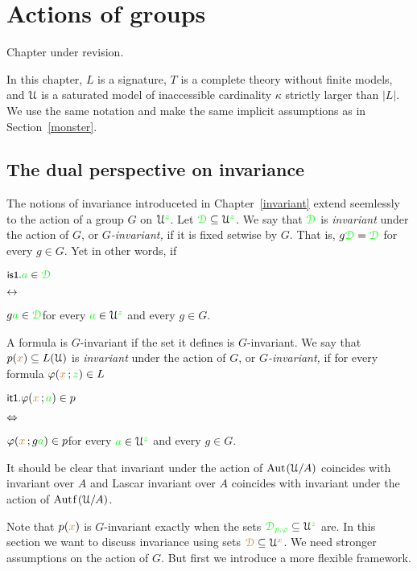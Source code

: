 \chapter{Actions of groups}
\label{actions}

\def\medrel#1{\parbox[t]{5ex}{$\displaystyle\hfil #1$}}
\def\ceq#1#2#3{\parbox[t]{17ex}{$\displaystyle #1$}\medrel{#2}{$\displaystyle #3$}}

\noindent\llap{\textcolor{red}{\Large\warning}\kern1.5ex}\ignorespaces
Chapter under revision.

In this chapter, $L$ is a signature, $T$ is a complete theory without finite models, and $\EuScript U$ is a saturated model of inaccessible cardinality $\kappa$ strictly larger than $|L|$.
We use the same notation and make the same implicit assumptions as in Section~\ref{monster}.

\section{The dual perspective on invariance}\label{dual_perspective}

The notions of invariance introduceted in Chapter~\ref{invariant} extend seemlessly to the action of a group $G$ on $\EuScript U^{\color{green} z}$.
Let ${\color{green}\EuScript D}\subseteq\EuScript U^{\color{green} z}$.
We say that ${\color{green}\EuScript D}$ is \emph{invariant\/} under the action of $G$, or \emph{$G$-invariant,} if it is fixed setwise by $G$.
That is, $g{\color{green}\EuScript D}={\color{green}\EuScript D}$ for every $g\in G$.
Yet in other words, if

\ceq{\ssf{is1.}\hfill {\gr a}\in\grD}{\iff}{g{\gr a}\in\grD}\hfill for every ${\color{green} a}\in\EuScript U^{\color{green} z}$ and every $g\in G$.

A formula is $G$-invariant if the set it defines is $G$-invariant.
We say that $p({\color{brown} x})\subseteq L(\EuScript U)$ is \emph{invariant\/} under the action of $G$, or \emph{$G$-invariant,} if for every formula $\varphi({\color{brown} x}\,;{\color{green} z})\in L$ 

\ceq{\ssf{it1.}\hfill\phi({\mr x}\,;{\gr a})\in p}{\IFF}{\phi({\mr x}\,;g{\gr a})\in p}\hfill for every ${\color{green} a}\in\EuScript U^{\color{green} z}$ and every $g\in G$.

It should be clear that invariant under the action of ${\rm Aut\kern.15ex}(\EuScript U/A)$ coincides with invariant over $A$ and Lascar invariant over $A$ coincides with invariant under the action of $\mathord{\rm Aut\kern.15ex{f}\kern.15ex}(\EuScript U/A)$.

Note that $p({\color{brown} x})$ is $G$-invariant exactly when the sets ${\color{green}\EuScript D_{p,\varphi}}\subseteq\EuScript U^{\color{green} z}$ are.
In this section we want to discuss invariance using sets ${\color{brown}\EuScript D}\subseteq\EuScript U^{\color{brown} x}$.
We need stronger assumptions on the action of $G$.
But first we introduce a more flexible framework.

